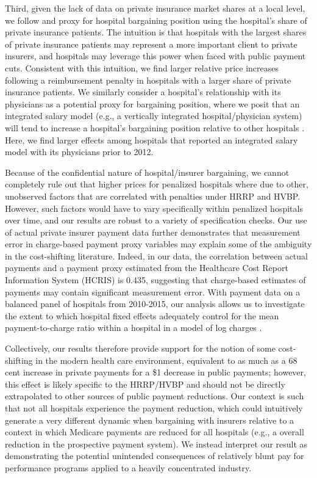 \documentclass[12pt]{article}
\begin{document}
Third, given the lack of data on private insurance market shares at a local level, we follow \cite{wu2010} and proxy for hospital bargaining position using the hospital's share of private insurance patients. The intuition is that hospitals with the largest shares of private insurance patients may represent a more important client to private insurers, and hospitals may leverage this power when faced with public payment cuts. Consistent with this intuition, we find larger relative price increases following a reimbursement penalty in hospitals with a larger share of private insurance patients. We similarly consider a hospital's relationship with its physicians as a potential proxy for bargaining position, where we posit that an integrated salary model (e.g., a vertically integrated hospital/physician system) will tend to increase a hospital's bargaining position relative to other hospitals \citep{lewis2015}. Here, we find larger effects among hospitals that reported an integrated salary model with its physicians prior to 2012.

Because of the confidential nature of hospital/insurer bargaining, we cannot completely rule out that higher prices for penalized hospitals where due to other, unobserved factors that are correlated with penalties under HRRP and HVBP. However, such factors would have to vary specifically within penalized hospitals over time, and our results are robust to a variety of specification checks. Our use of actual private insurer payment data further demonstrates that measurement error in charge-based payment proxy variables may explain some of the ambiguity in the cost-shifting literature. Indeed, in our data, the correlation between actual payments and a payment proxy estimated from the Healthcare Cost Report Information System (HCRIS) is 0.435, suggesting that charge-based estimates of payments may contain significant measurement error. With payment data on a balanced panel of hospitals from 2010-2015, our analysis allows us to investigate the extent to which hospital fixed effects adequately control for the mean payment-to-charge ratio within a hospital in a model of log charges \citep{cutler2000}.

Collectively, our results therefore provide support for the notion of some cost-shifting in the modern health care environment, equivalent to as much as a 68 cent increase in private payments for a \$1 decrease in public payments; however, this effect is likely specific to the HRRP/HVBP and should not be directly extrapolated to other sources of public payment reductions. Our context is such that not all hospitals experience the payment reduction, which could intuitively generate a very different dynamic when bargaining with insurers relative to a context in which Medicare payments are reduced for all hospitals (e.g., a overall reduction in the prospective payment system). We instead interpret our result as demonstrating the potential unintended consequences of relatively blunt pay for performance programs applied to a heavily concentrated industry.
\end{document}
